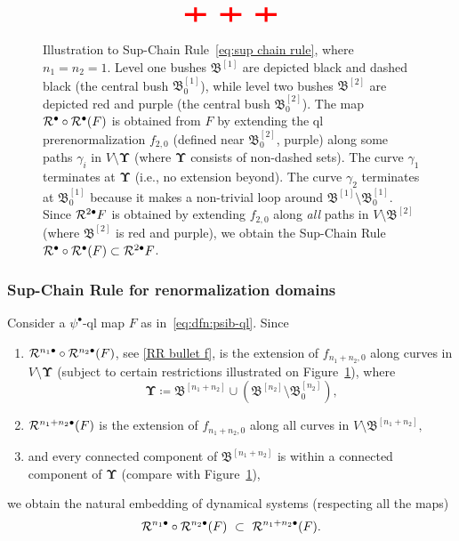 \documentclass{amsart}
\newcommand{\bush}{{\mathfrak B }}
\newcommand{\bbush}{{\boldsymbol {\mathfrak B} }}
\newcommand{\bUpsilon}{{\boldsymbol {\Upsilon} }}
\newcommand{\1}{{\mathbb 1 }}
\begin{document}
\begin{figure}[t!]
\[\begin{tikzpicture}
\begin{scope}[shift={(10,0)}]
\draw[red,line width=0.8mm] (-0.3,0) -- (0.3,0)
(0,0.2)--(0,-0.2);  
\draw[red,line width=0.8mm,shift={(1,0)}] (-0.3,0) -- (0.3,0)
(0,0.2)--(0,-0.2);  
\draw[red,line width=0.8mm,shift={(2,0)}] (-0.3,0) -- (0.3,0)
(0,0.2)--(0,-0.2);
\end{scope}
\end{tikzpicture}\]
\caption{Illustration to Sup-Chain Rule~\eqref{eq:sup chain rule}, where $n_1=n_2=1$. Level one bushes $\bbush^{[1]}$ are depicted black and dashed black (the central bush $\bush^{[1]}_0$), while level two  bushes $\bbush^{[2]}$ are depicted red and purple (the central bush $\bush^{[2]}_0$). The map ${\mathcal R}^{\bullet}\circ {\mathcal R}^{\bullet}(F)$ is obtained from $F$ by extending the ql prerenormalization $f_{2,0}$ (defined near $\bush^{[2]}_0$, purple) along some paths $\gamma_i$ in $V\setminus \bUpsilon$ (where $\bUpsilon$ consists of non-dashed sets). The curve $\gamma_1$ terminates at $\bUpsilon$ (i.e., no extension beyond). The curve $\gamma_2$ terminates at $\bbush^{[1]}_0$ because it makes a non-trivial loop around $\bbush^{[1]}\setminus \bush^{[1]}_0$.  Since ${\mathcal R}^{2 \bullet } F$ is obtained by extending $f_{2,0}$ along \emph{all} paths in $V\setminus \bbush^{[2]}$ (where $\bbush^{[2]}$ is red and purple), we obtain the Sup-Chain Rule ${\mathcal R}^{\bullet}\circ {\mathcal R}^{\bullet}(F)\subset {\mathcal R}^{2 \bullet } F$.}
\label{Fg:sup chain rule}
\end{figure}


\subsubsection{Sup-Chain Rule for renormalization domains} \label{sss:sup chain rule}Consider a $\psi^\bullet$-ql map $F$ as in~\eqref{eq:dfn:psib-ql}. Since 
\begin{enumerate}
\item \label{eq:SupChainRule:1}${\mathcal R}^{n_1\bullet} \circ {\mathcal R}^{n_2 \bullet} (F)$, see \eqref{RR bullet f}, is the extension of $f_{n_1+n_2,0}$ along curves in $V\setminus \bUpsilon$ (subject to certain restrictions illustrated on Figure~\ref{Fg:sup chain rule}), where
\[\bUpsilon\coloneqq \bbush^{[n_1+n_2]}\cup \left(\bbush^{[n_2]}\setminus \bush^{[n_2]}_0\right),\]
\item ${\mathcal R}^{n_1+n_2 \bullet} (F)$ is the extension of $f_{n_1+n_2,0}$ along all curves in $V\setminus \bbush^{[n_1+n_2]},$  
\item and every connected component of $\bbush^{[n_1+n_2]}$ is within a connected component of $\bUpsilon$ (compare with Figure~\ref{Fg:sup chain rule}),
\end{enumerate}
we obtain the natural embedding of dynamical systems (respecting all the maps)
\begin{equation}
\label{eq:sup chain rule}
{\mathcal R}^{n_1\bullet} \circ {\mathcal R}^{n_2 \bullet} (F) \ \subset \ {\mathcal R}^{n_1+n_2 \bullet} (F).
\end{equation} 
\end{document}
